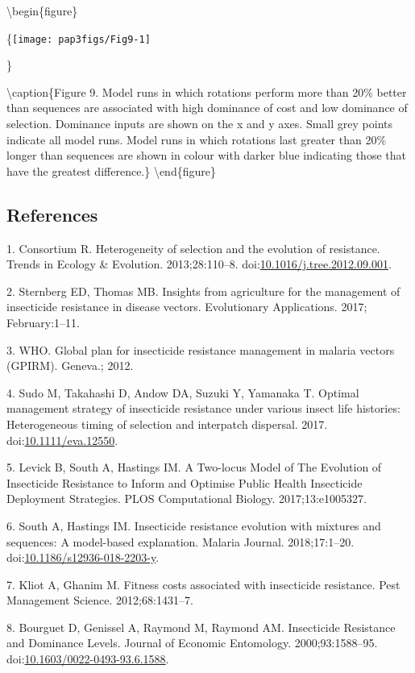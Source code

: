 \documentclass[11pt,]{article}
\begin{document}
\pagebreak

\textbackslash{}begin\{figure\}

\{\centering \texttt{[image: pap3figs/Fig9-1]}

\}

\textbackslash{}caption\{Figure 9. Model runs in which rotations perform
more than 20\% better than sequences are associated with high dominance
of cost and low dominance of selection. Dominance inputs are shown on
the x and y axes. Small grey points indicate all model runs. Model runs
in which rotations last greater than 20\% longer than sequences are
shown in colour with darker blue indicating those that have the greatest
difference.\}\label{fig:Fig9} \textbackslash{}end\{figure\}

\pagebreak

\subsection{References}\label{references}

\hypertarget{refs}{}
\hypertarget{ref-Consortium2013}{}
1. Consortium R. Heterogeneity of selection and the evolution of
resistance. Trends in Ecology \& Evolution. 2013;28:110--8.
doi:\href{https://doi.org/10.1016/j.tree.2012.09.001}{10.1016/j.tree.2012.09.001}.

\hypertarget{ref-Sternberg2017}{}
2. Sternberg ED, Thomas MB. Insights from agriculture for the management
of insecticide resistance in disease vectors. Evolutionary Applications.
2017; February:1--11.

\hypertarget{ref-WHO2012}{}
3. WHO. Global plan for insecticide resistance management in malaria
vectors (GPIRM). Geneva.; 2012.

\hypertarget{ref-Sudo2017}{}
4. Sudo M, Takahashi D, Andow DA, Suzuki Y, Yamanaka T. Optimal
management strategy of insecticide resistance under various insect life
histories: Heterogeneous timing of selection and interpatch dispersal.
2017. doi:\href{https://doi.org/10.1111/eva.12550}{10.1111/eva.12550}.

\hypertarget{ref-Levick2017}{}
5. Levick B, South A, Hastings IM. A Two-locus Model of The Evolution of
Insecticide Resistance to Inform and Optimise Public Health Insecticide
Deployment Strategies. PLOS Computational Biology. 2017;13:e1005327.

\hypertarget{ref-South2018}{}
6. South A, Hastings IM. Insecticide resistance evolution with mixtures
and sequences: A model-based explanation. Malaria Journal.
2018;17:1--20.
doi:\href{https://doi.org/10.1186/s12936-018-2203-y}{10.1186/s12936-018-2203-y}.

\hypertarget{ref-Kliot2012}{}
7. Kliot A, Ghanim M. Fitness costs associated with insecticide
resistance. Pest Management Science. 2012;68:1431--7.

\hypertarget{ref-Bourguet2000}{}
8. Bourguet D, Genissel A, Raymond M, Raymond AM. Insecticide Resistance
and Dominance Levels. Journal of Economic Entomology. 2000;93:1588--95.
doi:\href{https://doi.org/10.1603/0022-0493-93.6.1588}{10.1603/0022-0493-93.6.1588}.
\end{document}
